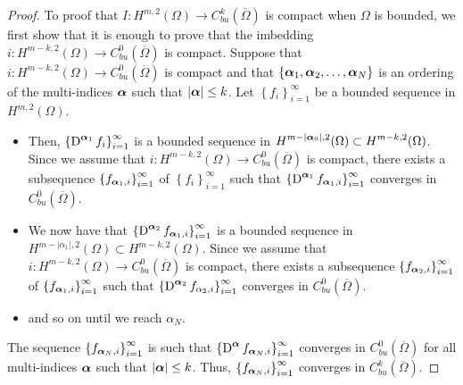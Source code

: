 \begin{proof}
 To proof that $\displaystyle I: H^{m,2}(\Omega) \to
C^k_{bu}(\overline{\Omega})$ is compact when $\Omega$ is bounded, we first
show that it is enough to prove that the imbedding
$\displaystyle i: H^{m-k,2}(\Omega) \to C^0_{bu}(\overline{\Omega})$ is
compact. Suppose that
$\displaystyle i: H^{m-k,2}(\Omega) \to C_{bu}^0(\overline{\Omega})$
is compact and that $\{{\bm{\alpha}}_1 , {\bm{\alpha}}_2, \ldots,
{\bm{\alpha}}_N\}$ is an ordering of the multi-indices ${\bm{\alpha}}$ such
that $|{\bm{\alpha}}| \leq k$. 
Let $\displaystyle \left\{ f_i \right\}_{i=1}^\infty$ be a bounded
sequence in $\displaystyle H^{m,2}(\Omega)$.
\begin{itemize}
\item Then,
$\displaystyle \left\{ \operatorname{D}^{{\bm{\alpha}}_1} f_i \right\}_{i=1}^\infty$
is a bounded sequence in
$\displaystyle H^{m-|{\bm{\alpha}}_0|,2}(\Omega) \subset H^{m-k,2}(\Omega)$.
Since we assume that
$\displaystyle i: H^{m-k,2}(\Omega) \to C_{bu}^0(\overline{\Omega})$
is compact, there exists a subsequence
$\displaystyle \left\{ f_{{\bm{\alpha}}_1,i} \right\}_{i=1}^\infty$
of $\displaystyle \left\{ f_i \right\}_{i=1}^\infty$
such that
$\displaystyle \left\{ \operatorname{D}^{{\bm{\alpha}}_1} f_{{\bm{\alpha}}_1,i}
\right\}_{i=1}^\infty$
converges in $\displaystyle C_{bu}^0(\overline{\Omega})$.
\item We now have that
$\displaystyle \left\{ \operatorname{D}^{{\bm{\alpha}}_2} f_{{\bm{\alpha}}_1,i}
\right\}_{i=1}^\infty$ is
a bounded sequence in
$\displaystyle H^{m-|\alpha_1|,2}(\Omega) \subset H^{m-k,2}(\Omega)$.
Since we assume that
$\displaystyle i: H^{m-k,2}(\Omega) \to C_{bu}^0(\overline{\Omega})$
is compact, there exists a subsequence
$\displaystyle \left\{ f_{{\bm{\alpha}}_2,i} \right\}_{i=1}^\infty$
of $\displaystyle \left\{ f_{{\bm{\alpha}}_1,i} \right\}_{i=1}^\infty$
such that
$\displaystyle \left\{ \operatorname{D}^{{\bm{\alpha}}_2} f_{\alpha_2,i}
\right\}_{i=1}^\infty$
converges in $\displaystyle C_{bu}^0(\overline{\Omega})$.
\item and so on until we reach $\alpha_N$.
\end{itemize}
The sequence
$\displaystyle \left\{ f_{{\bm{\alpha}}_N,i} \right\}_{i=1}^\infty$ is such
that
$\displaystyle \left\{ \operatorname{D}^{{\bm{\alpha}}} f_{{\bm{\alpha}}_N,i}
\right\}_{i=1}^\infty$
converges in $C_{bu}^0(\overline{\Omega})$ for all multi-indices ${\bm{\alpha}}$
such that $|{\bm{\alpha}}|\leq k$.  Thus,
$\displaystyle \left\{ f_{{\bm{\alpha}}_N,i} \right\}_{i=1}^\infty$
converges in $C_{bu}^k(\overline{\Omega})$.


\end{proof}

